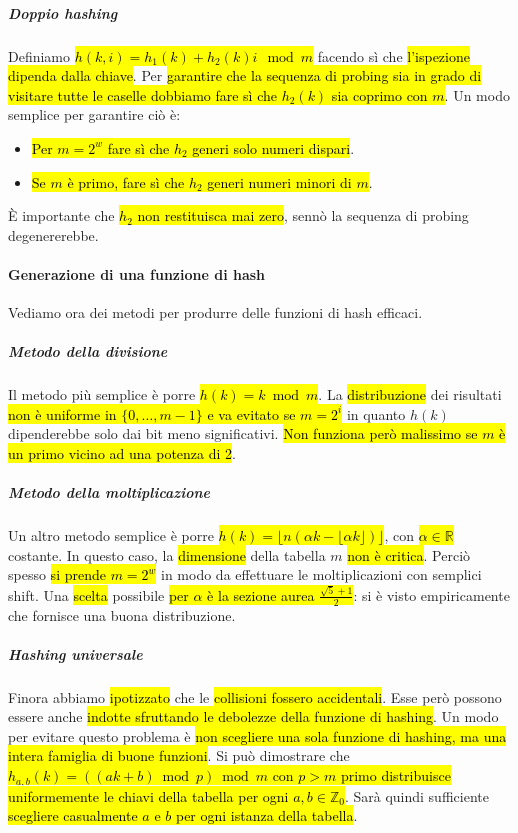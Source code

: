 \documentclass[a4paper,11pt,twoside]{article}
\theoremstyle{plain}
\theoremstyle{definition}
\theoremstyle{remark}
\begin{document}
\subparagraph{Doppio hashing} Definiamo \hl{$h(k,i) = h_1(k) + h_2(k)i \mod{m}$}
facendo sì che \hl{l'ispezione dipenda dalla chiave}. Per
\hl{garantire che la sequenza di probing sia in grado di visitare tutte le
caselle dobbiamo fare sì che $h_2(k)$ sia coprimo con $m$}. Un modo semplice per
garantire ciò è:

\begin{itemize}
  \item \hl{Per $m = 2^w$ fare sì che $h_2$ generi solo numeri dispari}.
  \item \hl{Se $m$ è primo, fare sì che $h_2$ generi numeri minori di $m$}.
\end{itemize}

\noindent È importante che \hl{$h_2$ non restituisca mai zero}, sennò la
sequenza di probing degenererebbe.

\paragraph{Generazione di una funzione di hash} Vediamo ora dei metodi per
produrre delle funzioni di hash efficaci.

\subparagraph{Metodo della divisione} Il metodo più semplice è porre \hl{$h(k) =
k \bmod m$}. La \hl{distribuzione} dei risultati \hl{non è uniforme in $\{0,
\ldots, m-1\}$ e va evitato se $m = 2^i$} in quanto $h(k)$ dipenderebbe solo dai
bit meno significativi. \hl{Non funziona però malissimo se $m$ è un primo vicino
ad una potenza di 2}.

\subparagraph{Metodo della moltiplicazione} Un altro metodo semplice è porre
\hl{$h(k) = \lfloor n(\alpha k - \lfloor \alpha k \rfloor) \rfloor$}, con
\hl{$\alpha \in \mathbb{R}$} costante. In questo caso, la \hl{dimensione} della
tabella $m$ \hl{non è critica}. Perciò spesso \hl{si prende $m = 2^w$} in modo
da effettuare le moltiplicazioni con semplici shift. Una \hl{scelta} possibile
\hl{per $\alpha$ è la sezione aurea $\frac{\sqrt{5} + 1}{2}$}: si è visto
empiricamente che fornisce una buona distribuzione.

\subparagraph{Hashing universale} Finora abbiamo \hl{ipotizzato} che le
\hl{collisioni fossero accidentali}. Esse però possono essere anche \hl{indotte
sfruttando le debolezze della funzione di hashing}. Un modo per evitare questo
problema è \hl{non scegliere una sola funzione di hashing, ma una intera
famiglia di buone funzioni}. Si può dimostrare che \hl{$h_{a,b}(k) = ((ak + b)
\bmod p) \bmod m$ con $p > m$ primo distribuisce uniformemente le chiavi della
tabella per ogni $a,b \in \mathbb{Z}_0$}. Sarà quindi sufficiente \hl{scegliere
casualmente $a$ e $b$ per ogni istanza della tabella}.
\end{document}
